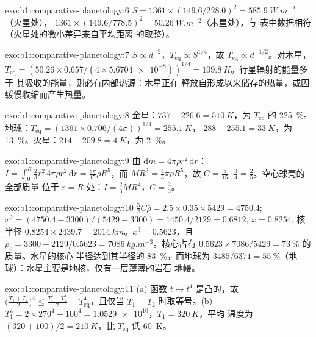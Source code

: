 \begin{solution}{exo:b1:comparative-planetology:6}
$S = 1361\times(149.6/228.0)^2 = \qty{585.9}{W.m^{-2}}$（火星处），
$1361\times(149.6/778.5)^2 = \qty{50.26}{W.m^{-2}}$（木星处），与
表中数据相符（火星处的微小差异来自平均距离
的取整）。
\end{solution}

\begin{solution}{exo:b1:comparative-planetology:7}
$S \propto d^{-2}$，$T_\mathrm{eq} \propto S^{1/4}$，故 $T_\mathrm{eq}
\propto d^{-1/2}$。对木星，$T_\mathrm{eq} = (50.26\times0.657/(4\times
\num{5.6704e-8}))^{1/4} = \qty{109.8}{K}$。行星辐射的能量多于
其吸收的能量，则必有内部热源：木星正在
释放自形成以来储存的热量，或因缓慢收缩而产生热量。
\end{solution}

\begin{solution}{exo:b1:comparative-planetology:8}
金星：$737 - 226.6 = \qty{510}{K}$，为 $T_\mathrm{eq}$ 的 \qty{225}{\percent}。
地球：$T_\mathrm{eq} = (1361\times0.706/(4\sigma))^{1/4} = \qty{255.1}{K}$，
$288 - 255.1 = \qty{33}{K}$，为 \qty{13}{\percent}。火星：$214 - 209.8 =
\qty{4}{K}$，为 \qty{2}{\percent}。
\end{solution}

\begin{solution}{exo:b1:comparative-planetology:9}
由 $\mathrm dm = 4\pi\rho r^2\,\mathrm dr$：$I = \int_0^R\tfrac23r^2\,4\pi
\rho r^2\,\mathrm dr = \tfrac{8\pi}{15}\rho R^5$，而 $MR^2 = \tfrac43\pi\rho
R^5$，故 $C = \tfrac{8}{15}\cdot\tfrac34 = \tfrac25$。空心球壳的全部质量
位于 $r = R$ 处：$I = \tfrac23MR^2$，$C = \tfrac23$。
\end{solution}

\begin{solution}{exo:b1:comparative-planetology:10}
$\tfrac52C\bar\rho = 2.5\times0.35\times5429 = 4750.4$;
$x^2 = (4750.4 - 3300)/(5429 - 3300) = 1450.4/2129 = 0.6812$, $x = 0.8254$,
核半径 $0.8254\times2439.7 = \qty{2014}{km}$。$x^3 = 0.5623$，且
$\rho_c = 3300 + 2129/0.5623 = \qty{7086}{kg.m^{-3}}$。核心占有
$0.5623\times7086/5429 = \qty{73}{\percent}$ 的质量。水星的核心
半径达到其半径的 \qty{83}{\percent}，而地球为 $3485/6371 =
\qty{55}{\percent}$（地球）：水星主要是地核，仅有一层薄薄的岩石
地幔。
\end{solution}

\begin{solution}{exo:b1:comparative-planetology:11}
(a) 函数 $t\mapsto t^4$ 是凸的，故
$\bigl(\tfrac{T_1 + T_2}{2}\bigr)^4 \le \tfrac{T_1^4 + T_2^4}{2} =
T_\mathrm{eq}^4$，且仅当 $T_1 = T_2$ 时取等号。(b) $T_1^4 =
2\times270^4 - 100^4 = \num{1.0529e10}$，$T_1 = \qty{320}{K}$，平均
温度为 $(320 + 100)/2 = \qty{210}{K}$，比
$T_\mathrm{eq}$ 低 \qty{60}{K}。
\end{solution}

